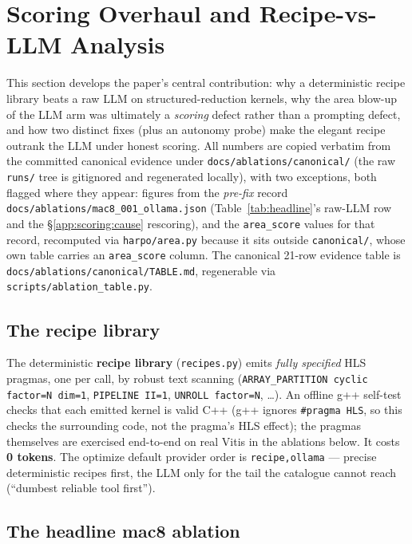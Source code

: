 \section{Scoring Overhaul and Recipe-vs-LLM Analysis}\label{app:scoring}

This section develops the paper's central contribution: why a
deterministic recipe library beats a raw LLM on structured-reduction kernels, why
the area blow-up of the LLM arm was ultimately a \emph{scoring} defect rather than a
prompting defect, and how two distinct fixes (plus an autonomy probe) make the
elegant recipe outrank the LLM under honest scoring. All numbers are copied verbatim
from the committed canonical evidence under \texttt{docs/ablations/canonical/} (the raw
\texttt{runs/} tree is gitignored and regenerated locally), with two exceptions, both
flagged where they appear: figures from the \emph{pre-fix} record
\texttt{docs/ablations/mac8\_001\_ollama.json} (Table~\ref{tab:headline}'s raw-LLM row
and the \S\ref{app:scoring:cause} rescoring), and the \texttt{area\_score} values for
that record, recomputed via \texttt{harpo/area.py} because it sits outside
\texttt{canonical/}, whose own table carries an \texttt{area\_score} column.
The canonical 21-row evidence table is \texttt{docs/ablations/canonical/TABLE.md},
regenerable via \texttt{scripts/ablation\_table.py}.

\subsection{The recipe library}\label{app:scoring:recipes}

The deterministic \textbf{recipe library} (\texttt{recipes.py}) emits
\emph{fully specified} HLS pragmas, one per call, by robust
text scanning (\texttt{ARRAY\_PARTITION cyclic factor=N dim=1},
\texttt{PIPELINE II=1}, \texttt{UNROLL factor=N}, \ldots). An offline g++ self-test checks that each emitted kernel is
valid C++ (g++ ignores \texttt{\#pragma HLS}, so this checks the surrounding code,
not the pragma's HLS effect); the pragmas themselves are exercised end-to-end on
real Vitis in the ablations below. It costs \textbf{0 tokens}. The optimize default
provider order is \texttt{recipe,ollama} --- precise deterministic recipes first, the
LLM only for the tail the catalogue cannot reach (``dumbest reliable tool first'').

\subsection{The headline mac8 ablation}\label{app:scoring:headline}

